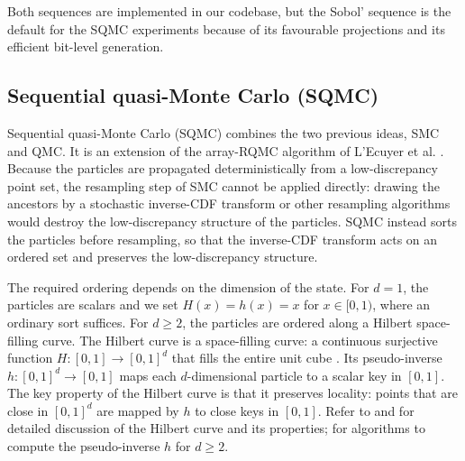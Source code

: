 

Both sequences are implemented in our codebase, but the Sobol' sequence is the default for the SQMC experiments because of its favourable projections and its efficient bit-level generation.


\subsection{Sequential quasi-Monte Carlo (SQMC)}
\label{sec:sqmc}

Sequential quasi-Monte Carlo (SQMC) combines the two previous ideas, SMC and QMC. It is an extension of the array-RQMC algorithm of L'Ecuyer et al. \citep{lecuyerlectuffin2006arrayrqmc}. Because the particles are propagated deterministically from a low-discrepancy point set, the resampling step of SMC cannot be applied directly: drawing the ancestors by a stochastic inverse-CDF transform or other resampling algorithms would destroy the low-discrepancy structure of the particles. SQMC instead sorts the particles before resampling, so that the inverse-CDF transform acts on an ordered set and preserves the low-discrepancy structure.

The required ordering depends on the dimension of the state. For $d=1$, the particles are scalars and we set $H(x) = h(x) = x$ for $x \in [0,1)$, where an ordinary sort suffices. For $d \geq 2$, the particles are ordered along a Hilbert space-filling curve. The Hilbert curve is a space-filling curve: a continuous surjective function $H: [0,1] \to [0,1]^d$ that fills the entire unit cube \citep{sagan1994spacefilling}. Its pseudo-inverse $h: [0,1]^d \to [0,1]$ maps each $d$-dimensional particle to a scalar key in $[0,1]$. The key property of the Hilbert curve is that it preserves locality: points that are close in $[0,1]^d$ are mapped by $h$ to close keys in $[0,1]$. Refer to \citet{sagan1994spacefilling} and \citet{butz1969convergencehilbert} for detailed discussion of the Hilbert curve and its properties; \citet{hamiltonrauchaplin2008compacthilbert} \citet{chopingerber2015sqmc} for algorithms to compute the pseudo-inverse $h$ for $d \geq 2$.

